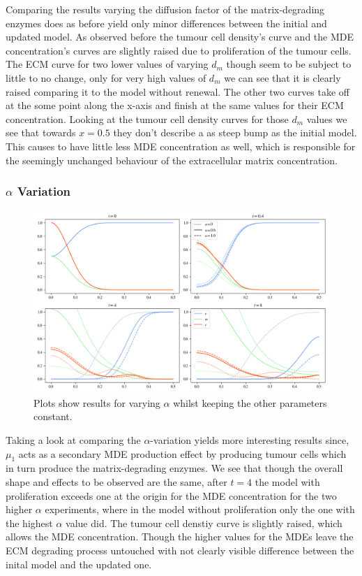 Comparing the results varying the diffusion factor of the matrix-degrading enzymes does as before yield only minor differences between the initial and updated model. As observed before the tumour cell density's curve and the MDE concentration's curves are slightly raised due to proliferation of the tumour cells. The ECM curve for two lower values of varying $d_m$ though seem to be subject to little to no change, only for very high values of $d_m$ we can see that it is clearly raised comparing it to the model without renewal. The other two curves take off at the some point along the x-axis and finish at the same values for their ECM concentration. Looking at the tumour cell density curves for those $d_m$ values we see that towards $x=0.5$ they don't describe a as steep bump as the initial model. This causes to have little less MDE concentration as well, which is responsible for the seemingly unchanged behaviour of the extracellular matrix concentration.

\subsubsection*{$\alpha$ Variation}
\begin{figure}[h]
    \centering
    \includegraphics[width=\textwidth]{resources/images/prolif_alpha_variation.png}
    \caption{Plots show results for varying $\alpha$ whilst keeping the other parameters constant.}
    \label{fig:prolif_alpha_variation}
\end{figure}

Taking a look at comparing the $\alpha$-variation yields more interesting results since, $\mu_1$ acts as a secondary MDE production effect by producing tumour cells which in turn produce the matrix-degrading enzymes. We see that though the overall shape and effects to be observed are the same, after $t=4$ the model with proliferation exceeds one at the origin for the MDE concentration for the two higher $\alpha$ experiments, where in the model without proliferation only the one with the highest $\alpha$ value did. The tumour cell denstiy curve is slightly raised, which allows the MDE concentration. Though the higher values for the MDEs leave the ECM degrading process untouched with not clearly visible difference between the inital model and the updated one. 

